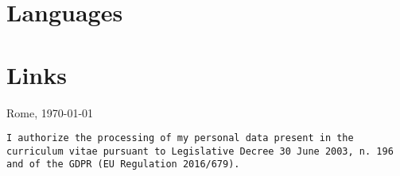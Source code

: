 \documentclass[10pt,a4paper,sans]{moderncv}
\begin{document}
\section{Languages}

\section{Links}

\begin{scriptsize}
\vspace{\fill} 
Rome, \today
\end{scriptsize}

\begin{footnotesize}
\begin{Verbatim}
I authorize the processing of my personal data present in the curriculum vitae pursuant to Legislative Decree 30 June 2003, n. 196 and of the GDPR (EU Regulation 2016/679).
\end{Verbatim}
\end{footnotesize}
\end{document}
